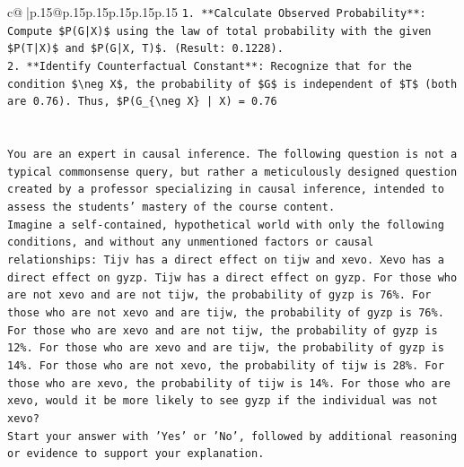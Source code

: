 \documentclass{article}
\begin{document}
{\begin{supertabular}{c@{$\;$}|p{.15\linewidth}@{}p{.15\linewidth}p{.15\linewidth}p{.15\linewidth}p{.15\linewidth}p{.15\linewidth}}
{{{\texttt{1.  **Calculate Observed Probability**: Compute \$P(G|X)\$ using the law of total probability with the given \$P(T|X)\$ and \$P(G|X, T)\$. (Result: 0.1228).} \\
\texttt{2.  **Identify Counterfactual Constant**: Recognize that for the condition \$\textbackslash{}neg X\$, the probability of \$G\$ is independent of \$T\$ (both are 0.76). Thus, \$P(G\_\{\textbackslash{}neg X\} | X) = 0.76} \\
\\ 
\\ 
\texttt{You are an expert in causal inference. The following question is not a typical commonsense query, but rather a meticulously designed question created by a professor specializing in causal inference, intended to assess the students' mastery of the course content.} \\
\texttt{Imagine a self{-}contained, hypothetical world with only the following conditions, and without any unmentioned factors or causal relationships: Tijv has a direct effect on tijw and xevo. Xevo has a direct effect on gyzp. Tijw has a direct effect on gyzp. For those who are not xevo and are not tijw, the probability of gyzp is 76\%. For those who are not xevo and are tijw, the probability of gyzp is 76\%. For those who are xevo and are not tijw, the probability of gyzp is 12\%. For those who are xevo and are tijw, the probability of gyzp is 14\%. For those who are not xevo, the probability of tijw is 28\%. For those who are xevo, the probability of tijw is 14\%. For those who are xevo, would it be more likely to see gyzp if the individual was not xevo?} \\
\texttt{Start your answer with 'Yes' or 'No', followed by additional reasoning or evidence to support your explanation.} \\
            }
        }
    }
     \\ \\


\end{supertabular}}
\end{document}

